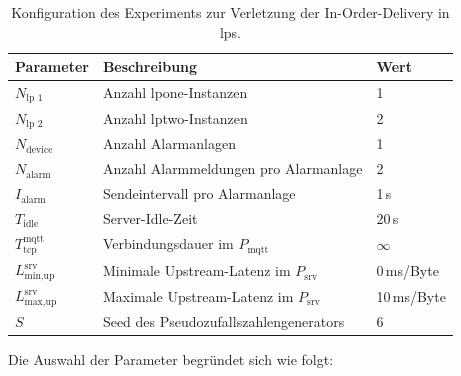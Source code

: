 \begin{table}[H]
	\centering
	\renewcommand{\arraystretch}{1.2}
	\caption{Konfiguration des Experiments zur Verletzung der In-Order-Delivery in \acrshort{lps}.}
	\label{tab:exp-lps-iod-config}
	\begin{tabular}{|l|l|l|}
		\hline
		\textbf{Parameter}               & \textbf{Beschreibung}                        & \textbf{Wert} \\
		\hline
		$N_{\text{lp~1}}$                & Anzahl \gls{lpone}-Instanzen                 & 1             \\
		$N_{\text{lp~2}}$                & Anzahl \gls{lptwo}-Instanzen                 & 2             \\
		$N_{\text{device}}$              & Anzahl Alarmanlagen                          & 1             \\
		$N_{\text{alarm}}$               & Anzahl Alarmmeldungen pro Alarmanlage        & 2             \\
		$I_{\text{alarm}}$               & Sendeintervall pro Alarmanlage               & 1\,s          \\
		$T_{\text{idle}}$                & Server-Idle-Zeit                             & 20\,s         \\
		$T_{\text{tcp}}^{\text{mqtt}}$   & Verbindungsdauer im $P_{\text{mqtt}}$        & $\infty$      \\
		$L_{\text{min,up}}^{\text{srv}}$ & Minimale Upstream-Latenz im $P_{\text{srv}}$ & 0\,ms/Byte    \\
		$L_{\text{max,up}}^{\text{srv}}$ & Maximale Upstream-Latenz im $P_{\text{srv}}$ & 10\,ms/Byte   \\
		$S$                              & Seed des Pseudozufallszahlengenerators       & 6             \\
		\hline
	\end{tabular}
\end{table}

\newpage

Die Auswahl der Parameter begründet sich wie folgt:

